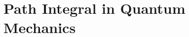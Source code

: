 \documentclass[11pt]{report}
\begin{document}
\setcounter{chapter}{1}

\chapter{Path Integral in Quantum Mechanics}
\label{chap:lec1}

\end{document}
